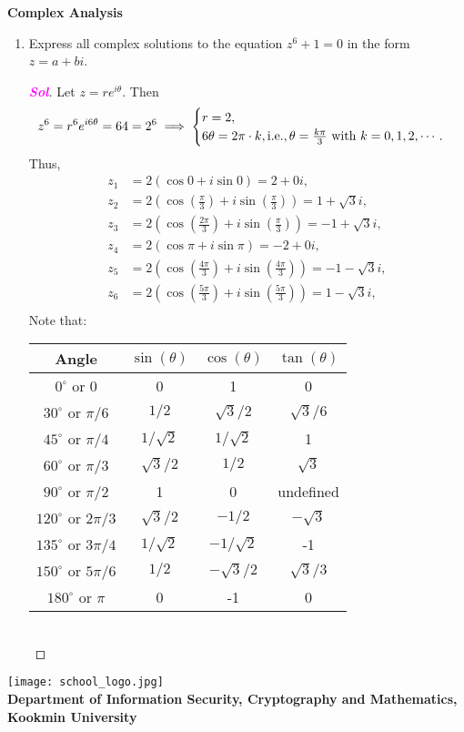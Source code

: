\documentclass{article}
\newcommand{\footer}[1]{
	\begin{flushright}
		\vspace{2em}
		\texttt{[image: school\_logo.jpg]} \\
		\vspace{1em}
		\textcolor{blue2}{\small\textbf{#1}}
	\end{flushright}
}
\newcommand{\ie}{\textnormal{i.e.}}
\theoremstyle{definition}
\newcommand{\of}[1]{\left( #1 \right)}
\newcommand{\sol}{\textcolor{magenta}{\bf Sol}}
\begin{document}
	\begin{center}
		\huge\textbf{Complex Analysis}\\
		\vspace{0.5em}
	\end{center}
	
	\begin{enumerate}
		\item  Express all complex solutions to the equation $z^6 + 1 = 0$ in the form $z = a + bi$.
		\begin{proof}[\sol]
			Let $z=re^{i\theta}$. Then \[
			z^6=r^6e^{i 6\theta}=64=2^6\implies\begin{cases}
			r = 2,\\
			6\theta = 2\pi\cdot k, \ie, \theta=\frac{k\pi}{3}\ \text{with}\ k=0,1,2,\cdots.
			\end{cases}
			\] Thus, \begin{align*}
			z_1&=2\of{\cos 0+i\sin 0}=2+0i,\\
			z_2&=2\of{\cos\of{\frac{\pi}{3}}+i\sin\of{\frac{\pi}{3}}}=1+\sqrt{3}i,\\
			z_3&=2\of{\cos\of{\frac{2\pi}{3}}+i\sin\of{\frac{\pi}{3}}}=-1+\sqrt{3}i,\\
			z_4&=2\of{\cos\pi+i\sin\pi}=-2+0i,\\
			z_5&=2\of{\cos\of{\frac{4\pi}{3}}+i\sin\of{\frac{4\pi}{3}}}=-1-\sqrt{3}i,\\
			z_6&=2\of{\cos\of{\frac{5\pi}{3}}+i\sin\of{\frac{5\pi}{3}}}=1-\sqrt{3}i,\\
			\end{align*}
			Note that: \begin{table}[ht!]
				\centering
				\begin{tabular}{c||c|c|c}
					\toprule
					Angle & $\sin(\theta)$ & $\cos(\theta)$ & $\tan(\theta)$ \\
					\midrule
					$0^\circ$ or $0$ & 0 & 1 & 0 \\
					$30^\circ$ or ${\pi}/{6}$ & ${1}/{2}$ & ${\sqrt{3}}/{2}$ & ${\sqrt{3}}/{6}$ \\
					$45^\circ$ or ${\pi}/{4}$ & ${1}/{\sqrt{2}}$ & ${1}/{\sqrt{2}}$ & 1 \\
					$60^\circ$ or ${\pi}/{3}$ & ${\sqrt{3}}/{2}$ & ${1}/{2}$ & $\sqrt{3}$ \\
					$90^\circ$ or ${\pi}/{2}$ & 1 & 0 & undefined \\
					$120^\circ$ or ${2\pi}/{3}$ & ${\sqrt{3}}/{2}$ & $-{1}/{2}$ & $-\sqrt{3}$ \\
					$135^\circ$ or ${3\pi}/{4}$ & ${1}/{\sqrt{2}}$ & $-{1}/{\sqrt{2}}$ & -1 \\
					$150^\circ$ or ${5\pi}/{6}$ & ${1}/{2}$ & $-{\sqrt{3}}/{2}$ & ${\sqrt{3}}/{3}$ \\
					$180^\circ$ or $\pi$ & 0 & -1 & 0 \\
					\bottomrule
				\end{tabular}
			\end{table}\\
		\end{proof}
	\end{enumerate}
	
	
	\footer{Department of Information Security, Cryptography and Mathematics, Kookmin University}
\end{document}

